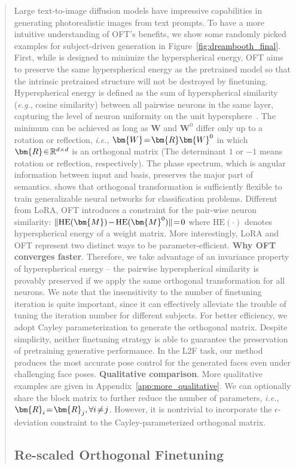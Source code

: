 \begin{itemize}[leftmargin=*,nosep]
\begin{itemize}[leftmargin=*,nosep]
\begin{abstract}
Large text-to-image diffusion models have impressive capabilities in generating photorealistic images from text prompts. To have a more intuitive understanding of OFT's benefits, we show some randomly picked examples for subject-driven generation in Figure~\ref{fig:dreambooth_final}. First, while \cite{liu2021orthogonal} is designed to minimize the hyperspherical energy, OFT aims to preserve the same hyperspherical energy as the pretrained model so that the intrinsic pretrained structure will not be destroyed by finetuning. Hyperspherical energy is defined as the sum of hyperspherical similarity (\emph{e.g.}, cosine similarity) between all pairwise neurons in the same layer, capturing the level of neuron uniformity on the unit hypersphere~\cite{liu2021learning}. The minimum can be achieved as long as $\bm{W}$ and $\bm{W}^0$ differ only up to a rotation or reflection, \emph{i.e.}, $\thickmuskip=2mu \medmuskip=2mu \bm{W}=\bm{R}\bm{W}^0$ in which $\thickmuskip=2mu \medmuskip=2mu \bm{R}\in\mathbb{R}^{d\times d}$ is an orthogonal matrix (The determinant $1$ or $-1$ means rotation or reflection, respectively). The phase spectrum, which is angular information between input and basis, preserves the major part of semantics. \cite{liu2021orthogonal} shows that orthogonal transformation is sufficiently flexible to train generalizable neural networks for classification problems. Different from LoRA, OFT introduces a constraint for the pair-wise neuron similarity: $\thickmuskip=2mu \medmuskip=2mu \| \text{HE}(\bm{M})-\text{HE}(\bm{M}^0) \|=0$ where $\text{HE}(\cdot)$ denotes hyperspherical energy of a weight matrix. More interestingly, LoRA and OFT represent two distinct ways to be parameter-efficient. \textbf{Why OFT converges faster}. Therefore, we take advantage of an invariance property of hyperspherical energy -- the pairwise hyperspherical similarity is provably preserved if we apply the same orthogonal transformation for all neurons. We note that the insensitivity to the number of finetuning iteration is quite important, since it can effectively alleviate the trouble of tuning the iteration number for different subjects. For better efficiency, we adopt Cayley parameterization to generate the orthogonal matrix. Despite simplicity, neither finetuning strategy is able to guarantee the preservation of pretraining generative performance. In the L2F task, our method produces the most accurate pose control for the generated faces even under challenging face poses. \textbf{Qualitative comparison}. More qualitative examples are given in Appendix~\ref{app:more_qualitative}. We can optionally share the block matrix to further reduce the number of parameters, \emph{i.e.}, $\thickmuskip=2mu \medmuskip=2mu\bm{R}_i=\bm{R}_j,\forall i\neq j$. However, it is nontrivial to incorporate the $\epsilon$-deviation constraint to the Cayley-parameterized orthogonal matrix. \subsection{Re-scaled Orthogonal Finetuning}


\end{abstract}
\end{itemize}
\end{itemize}
